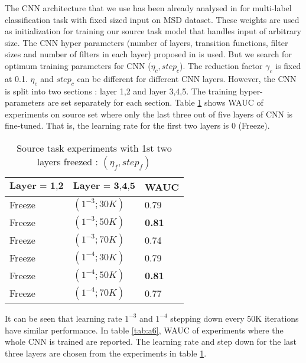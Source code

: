\noindent The CNN architecture that we use has been already analysed in \cite{choi_cnn} for multi-label classification task with fixed sized input on MSD dataset. These weights are used as initialization for training our source task model that handles input of arbitrary size. The CNN hyper parameters (number of layers, transition functions, filter sizes and number of filters in each layer) proposed in \cite{choi_cnn} is used. But we search for optimum training parameters for CNN ($\eta_{c}, step_{c}$). The reduction factor $\gamma_{c}$ is fixed at 0.1. $\eta_{c}$ and $step_{c}$ can be different for different CNN layers. However, the CNN is split into two sections : layer 1,2 and layer 3,4,5. The training hyper-parameters are set separately for each section. Table \ref{tab:a5} shows WAUC of experiments on source set where only the last three out of five layers of CNN is fine-tuned. That is, the learning rate for the first two layers is 0 (Freeze).    
\begin{table}[H]
\label{tab:a5}
\centering
\begin{tabular}{| p{} | p{}| p{}| }
\hline
$\textbf{Layer = 1,2}$ & $\textbf{Layer = 3,4,5}$ & \textbf{WAUC}\\
\hline
Freeze & $(1^{-3}; 30K)$ & 0.79\\
\hline
Freeze & $(1^{-3}; 50K)$ & \textbf{0.81}\\
\hline
Freeze & $(1^{-3}; 70K)$ & 0.74\\
\hline
Freeze & $(1^{-4}; 30K)$ & 0.79\\
\hline
Freeze & $(1^{-4}; 50K)$ & \textbf{0.81}\\
\hline
Freeze & $(1^{-4}; 70K)$ & 0.77\\
\hline
\end{tabular}
\caption{Source task experiments with 1st two layers freezed : $(\eta_{f}, {step}_{f})$} 
\end{table}
\noindent It can be seen that learning rate $1^{-3}$ and $1^{-4}$ stepping down every 50K iterations have similar performance. In table \ref{tab:a6}, WAUC of experiments where the whole CNN is trained are reported. The learning rate and step down for the last three layers are chosen from the experiments in table \ref{tab:a5}.  
